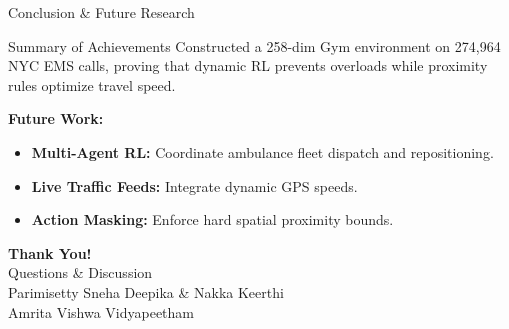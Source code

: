 \documentclass[aspectratio=169, 10pt]{beamer}
\begin{document}
\begin{frame}{Conclusion \& Future Research}
    \begin{block}{Summary of Achievements}
        Constructed a 258-dim Gym environment on 274,964 NYC EMS calls, proving that dynamic RL prevents overloads while proximity rules optimize travel speed.
    \end{block}

    \vspace{0.3cm}
    \textbf{Future Work:}
    \begin{itemize}
        \item \textbf{Multi-Agent RL:} Coordinate ambulance fleet dispatch and repositioning.
        \item \textbf{Live Traffic Feeds:} Integrate dynamic GPS speeds.
        \item \textbf{Action Masking:} Enforce hard spatial proximity bounds.
    \end{itemize}
\end{frame}

\begin{frame}
    \centering
    \Huge \textbf{Thank You!} \\
    \vspace{0.5cm}
    \Large Questions \& Discussion \\
    \vspace{0.8cm}
    \small Parimisetty Sneha Deepika \& Nakka Keerthi \\
    Amrita Vishwa Vidyapeetham
\end{frame}
\end{document}
